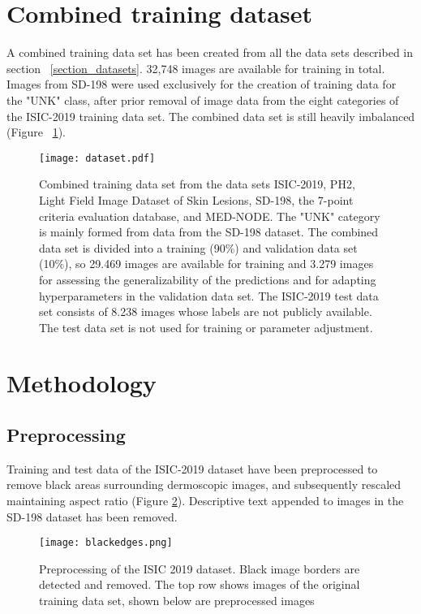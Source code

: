 \documentclass[journal]{IEEEtran}
\begin{document}
\section{Combined training dataset}
A combined training data set has been created from all the data sets described in section ~\ref{section_datasets}. 32,748 images are available for training in total. Images from SD-198 were used exclusively for the creation of training data for the "UNK" class, after prior removal of image data from the eight categories of the ISIC-2019 training data set. The combined data set is still heavily imbalanced (Figure ~\ref{dataset}).

\begin{figure}[!t]
\centering
\texttt{[image: dataset.pdf]}
\caption{Combined training data set from the data sets ISIC-2019, PH2, Light Field Image Dataset of Skin Lesions, SD-198, the 7-point criteria evaluation database, and MED-NODE. The "UNK" category is mainly formed from data from the SD-198 dataset. The combined data set is divided into a training (90\%) and validation data set (10\%), so 29.469 images are available for training and 3.279 images for assessing the generalizability of the predictions and for adapting hyperparameters in the validation data set. The ISIC-2019 test data set consists of 8.238 images whose labels are not publicly available. The test data set is not used for training or parameter adjustment.}
\label{dataset}
\end{figure}


\section{Methodology}

\subsection{Preprocessing}
Training and test data of the ISIC-2019 dataset have been preprocessed to remove black areas surrounding dermoscopic images, and subsequently rescaled maintaining aspect ratio (Figure \ref{blackedges}). Descriptive text appended to images in the SD-198 dataset has been removed.
\begin{figure}[ht]
\centering
\texttt{[image: blackedges.png]}
\caption{Preprocessing of the ISIC 2019 dataset. Black image borders are detected and removed. The top row shows images of the original training data set, shown below are preprocessed images}
\label{blackedges}
\end{figure}
\end{document}
